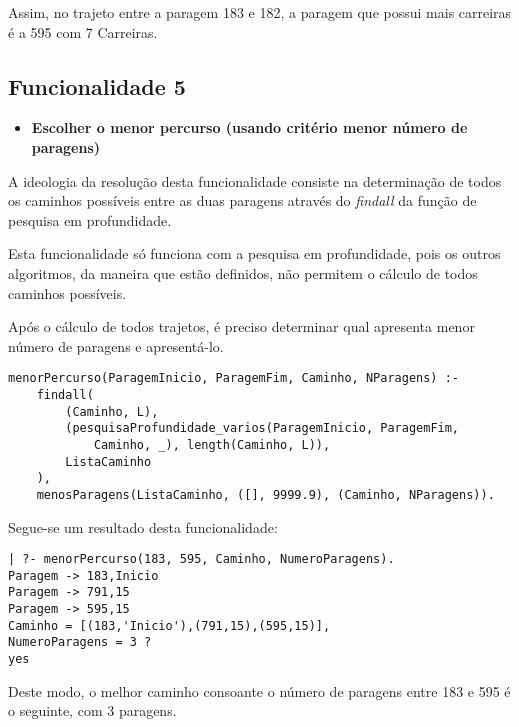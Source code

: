 \documentclass[a4paper,12pt]{report}
\begin{document}
\par Assim, no trajeto entre a paragem 183 e 182, a paragem que possui mais carreiras é a 595 com 7 Carreiras.

\vspace{1cm}

\subsection{Funcionalidade 5}
\begin{itemize}
    \item \textbf{Escolher o menor percurso (usando critério menor número de paragens)}
\end{itemize}

\par A ideologia da resolução desta funcionalidade consiste na determinação de todos os caminhos possíveis entre as duas paragens através do \textit{findall} da função de pesquisa em profundidade.
\par Esta funcionalidade só funciona com a pesquisa em profundidade, pois os outros algoritmos, da maneira que estão definidos, não permitem o cálculo de todos caminhos possíveis.
\par Após o cálculo de todos trajetos, é preciso determinar qual apresenta menor número de paragens e apresentá-lo.

\begin{verbatim}
menorPercurso(ParagemInicio, ParagemFim, Caminho, NParagens) :-
    findall(
        (Caminho, L),
        (pesquisaProfundidade_varios(ParagemInicio, ParagemFim,
            Caminho, _), length(Caminho, L)),
        ListaCaminho
    ),
    menosParagens(ListaCaminho, ([], 9999.9), (Caminho, NParagens)). 
\end{verbatim}      

\vspace{0.5cm}

Segue-se um resultado desta funcionalidade:

\begin{verbatim}
| ?- menorPercurso(183, 595, Caminho, NumeroParagens).
Paragem -> 183,Inicio
Paragem -> 791,15
Paragem -> 595,15
Caminho = [(183,'Inicio'),(791,15),(595,15)],
NumeroParagens = 3 ? 
yes
\end{verbatim} 

\par Deste modo, o melhor caminho consoante o número de paragens entre 183 e 595 é o seguinte, com 3 paragens.

\vspace{1cm}
\end{document}
